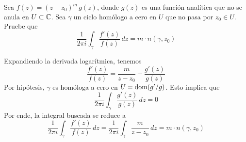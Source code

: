 \begin{exercise}
Sea $f(z) = (z - z_0)^m \, g(z)$, donde $g(z)$ es una función analítica que no se anula en $U \subset \mathbb C$. Sea $\gamma$ un ciclo homólogo a cero en $U$ que no pasa por $z_0 \in U$. Pruebe que
$$\frac 1 {2\pi i} \int_\gamma \frac {f'(z)} {f(z)} \, dz = m \cdot n(\gamma, z_0)$$
\end{exercise}

\begin{solution}
Expandiendo la derivada logarítmica, tenemos
$$\frac {f'(z)} {f(z)} = \frac m {z - z_0} + \frac {g'(z)} {g(z)}$$
Por hipótesis, $\gamma$ es homóloga a cero en $U = \operatorname{dom}(g'/g)$. Esto implica que
$$\frac 1 {2\pi i} \int_\gamma \frac {g'(z)} {g(z)} \, dz = 0$$
Por ende, la integral buscada se reduce a
$$
\frac 1 {2\pi i} \int_\gamma \frac {f'(z)} {f(z)} \, dz
    = \frac 1 {2\pi i} \int_\gamma \frac m {z - z_0} \, dz
    = m \cdot n(\gamma, z_0)
$$
\end{solution}
